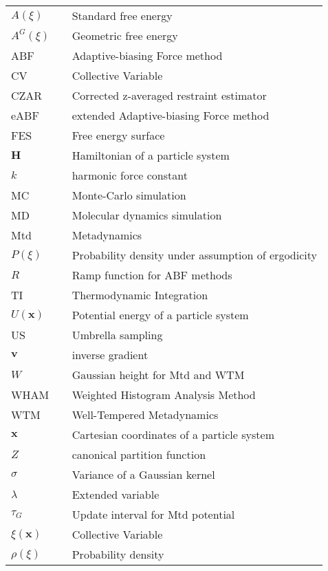\label{cha:symbols}

\begin{longtable}[l]{lcp{10cm}}
	$A(\xi)$ &&  Standard free energy \\
	$A^G(\xi)$ && Geometric free energy \\
	ABF		&&  Adaptive-biasing Force method \\
	CV    &&  Collective Variable \\
	CZAR  &&  Corrected z-averaged restraint estimator \\
	eABF  &&  extended Adaptive-biasing Force method \\
	FES   &&  Free energy surface \\
	$\textbf{H}$ && Hamiltonian of a particle system \\
	$k$   &&  harmonic force constant \\
	MC    &&  Monte-Carlo simulation \\
	MD    &&  Molecular dynamics simulation \\
	Mtd   &&  Metadynamics \\
	$P(\xi)$   &&  Probability density under assumption of ergodicity \\
	$R$   &&  Ramp function for ABF methods \\
	TI    &&  Thermodynamic Integration \\
  $U(\textbf{x})$   &&  Potential energy of a particle system \\
  US    &&  Umbrella sampling \\
	$\textbf{v}$ && inverse gradient \\
	$W$   &&  Gaussian height for Mtd and WTM \\
	WHAM  && Weighted Histogram Analysis Method \\
	WTM   &&  Well-Tempered Metadynamics \\
	$\textbf{x}$ && Cartesian coordinates of a particle system \\
	$Z$   &&  canonical partition function \\
  $\sigma$ && Variance of a Gaussian kernel \\
	$\lambda$ && Extended variable \\
	$\tau_G$ && Update interval for Mtd potential \\
	$\xi(\textbf{x})$ && Collective Variable \\
	$\rho(\xi)$ && Probability density \\
\end{longtable}
